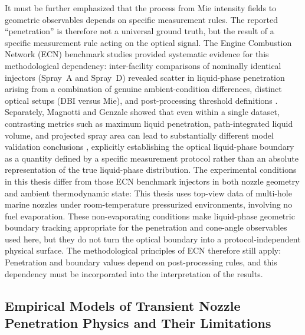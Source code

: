 It must be further emphasized that the process from Mie intensity fields to geometric observables depends on specific measurement rules.
The reported ``penetration'' is therefore not a universal ground truth, but the result of a specific measurement rule acting on the optical signal.
The Engine Combustion Network (ECN) benchmark studies provided systematic evidence for this methodological dependency:
inter-facility comparisons of nominally identical injectors (Spray~A and Spray~D) revealed scatter in liquid-phase penetration arising from a combination of genuine ambient-condition differences, distinct optical setups (DBI versus Mie), and post-processing threshold definitions \cite{ecn_liquid_penetration,ecn_liquid_penetration_accessory,MeijerECN2012}.
Separately, Magnotti and Genzale showed that even within a single dataset, contrasting metrics such as maximum liquid penetration, path-integrated liquid volume, and projected spray area can lead to substantially different model validation conclusions \cite{MagnottiGenzale2013}, explicitly establishing the optical liquid-phase boundary as a quantity defined by a specific measurement protocol rather than an absolute representation of the true liquid-phase distribution.
The experimental conditions in this thesis differ from those ECN benchmark injectors in both nozzle geometry and ambient thermodynamic state:
This thesis uses top-view data of multi-hole marine nozzles under room-temperature pressurized environments, involving no fuel evaporation.
These non-evaporating conditions make liquid-phase geometric boundary tracking appropriate for the penetration and cone-angle observables used here, but they do not turn the optical boundary into a protocol-independent physical surface.
The methodological principles of ECN therefore still apply:
Penetration and boundary values depend on post-processing rules, and this dependency must be incorporated into the interpretation of the results.

\subsection{Empirical Models of Transient Nozzle Penetration Physics and Their Limitations}

